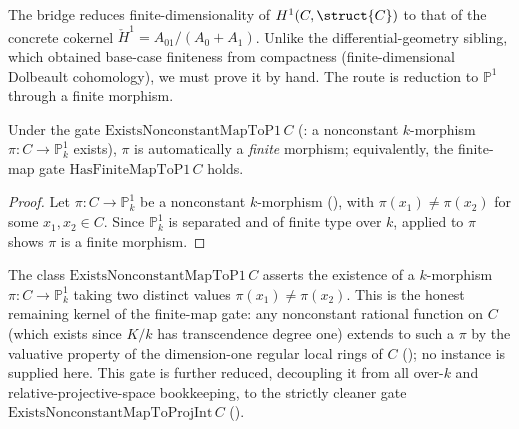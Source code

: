 The bridge  reduces
finite-dimensionality of \(H^1(C, \struct{C})\) to that of the concrete
cokernel \(\check{H}^1 = A_{01}/(A_0 + A_1)\). Unlike the
differential-geometry sibling, which obtained base-case finiteness from
compactness (finite-dimensional Dolbeault cohomology), we must prove it
by hand. The route is reduction to \(\mathbb{P}^1\) through a finite
morphism.

\begin{proposition}
  \label{thm:adelic_exists_finiteMorphismToP1}
  \leanok
  Under the gate \(\mathrm{ExistsNonconstantMapToP1}\, C\)
  (: a nonconstant \(k\)-morphism
  \(\pi \colon C \to \mathbb{P}^1_k\) exists), \(\pi\) is automatically
  a \emph{finite} morphism; equivalently, the finite-map gate
  \(\mathrm{HasFiniteMapToP1}\, C\) holds.
\end{proposition}
\begin{proof}
  \leanok
  Let \(\pi \colon C \to \mathbb{P}^1_k\) be a nonconstant \(k\)-morphism
  (), with \(\pi(x_1) \ne
  \pi(x_2)\) for some \(x_1, x_2 \in C\). Since \(\mathbb{P}^1_k\) is
  separated and of finite type over \(k\), 
  applied to \(\pi\) shows \(\pi\) is a finite morphism.
\end{proof}

\begin{definition}
  \label{def:adelic_nonconstant_map_gate}
  \notready  %
  The class \(\mathrm{ExistsNonconstantMapToP1}\, C\) asserts the
  existence of a \(k\)-morphism \(\pi \colon C \to \mathbb{P}^1_k\)
  taking two distinct values \(\pi(x_1) \ne \pi(x_2)\). This is the
  honest remaining kernel of the finite-map gate: any nonconstant
  rational function on \(C\) (which exists since \(K/k\) has
  transcendence degree one) extends to such a \(\pi\) by the valuative
  property of the dimension-one regular local rings of \(C\)
  (); no instance is supplied
  here. This gate is further reduced, decoupling it from all over-\(k\)
  and relative-projective-space bookkeeping, to the strictly cleaner
  gate \(\mathrm{ExistsNonconstantMapToProjInt}\, C\)
  ().
\end{definition}

